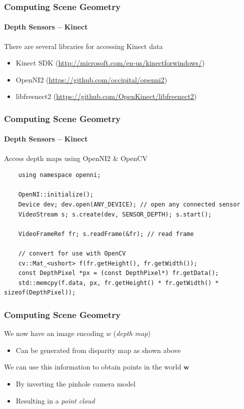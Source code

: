 \documentclass[xetex,professionalfont]{beamer}
\renewcommand{\vec}[1]{\ensuremath{\mathbf{#1}}}
\newcommand{\vw}{\vec{w}}
\begin{document}

\begin{frame}
\frametitle{Computing Scene Geometry}
\framesubtitle{Depth Sensors -- Kinect}

There are several libraries for accessing Kinect data
\begin{itemize}
    \item Kinect SDK (\url{http://microsoft.com/en-us/kinectforwindows/}) %
    \item OpenNI2 (\url{https://github.com/occipital/openni2}) %
    \item libfreenect2 (\url{https://github.com/OpenKinect/libfreenect2}) %
\end{itemize}

\end{frame}


\begin{frame}[fragile]
\frametitle{Computing Scene Geometry}
\framesubtitle{Depth Sensors -- Kinect}

Access depth maps using OpenNI2 \& OpenCV

\bigskip
\footnotesize
\begin{verbatim}
    using namespace openni;

    OpenNI::initialize();
    Device dev; dev.open(ANY_DEVICE); // open any connected sensor
    VideoStream s; s.create(dev, SENSOR_DEPTH); s.start();

    VideoFrameRef fr; s.readFrame(&fr); // read frame

    // convert for use with OpenCV
    cv::Mat_<ushort> f(fr.getHeight(), fr.getWidth());
    const DepthPixel *px = (const DepthPixel*) fr.getData();
    std::memcpy(f.data, px, fr.getHeight() * fr.getWidth() * sizeof(DepthPixel));
\end{verbatim}

\end{frame}


\begin{frame}
\frametitle{Computing Scene Geometry}

We now have an image encoding $w$ (\emph{depth map})
\begin{itemize}
    \item Can be generated from disparity map as shown above
\end{itemize}

\bigskip
We can use this information to obtain points in the world $\vw$
\begin{itemize}
    \item By inverting the pinhole camera model
    \item Resulting in a \emph{point cloud}
\end{itemize}

\end{frame}
\end{document}
